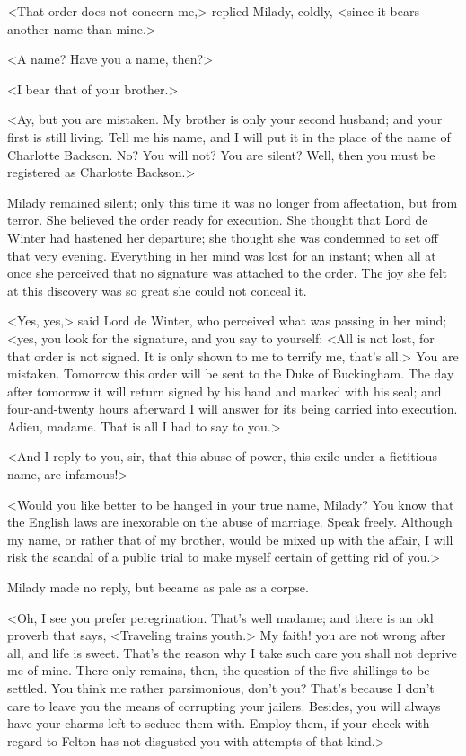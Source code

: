 <That order does not concern me,> replied Milady, coldly, <since it bears another name than mine.> 

<A name? Have you a name, then?> 

<I bear that of your brother.> 

<Ay, but you are mistaken. My brother is only your second husband; and your first is still living. Tell me his name, and I will put it in the place of the name of Charlotte Backson. No? You will not? You are silent? Well, then you must be registered as Charlotte Backson.> 

Milady remained silent; only this time it was no longer from affectation, but from terror. She believed the order ready for execution. She thought that Lord de Winter had hastened her departure; she thought she was condemned to set off that very evening. Everything in her mind was lost for an instant; when all at once she perceived that no signature was attached to the order. The joy she felt at this discovery was so great she could not conceal it. 

<Yes, yes,> said Lord de Winter, who perceived what was passing in her mind; <yes, you look for the signature, and you say to yourself: <All is not lost, for that order is not signed. It is only shown to me to terrify me, that's all.> You are mistaken. Tomorrow this order will be sent to the Duke of Buckingham. The day after tomorrow it will return signed by his hand and marked with his seal; and four-and-twenty hours afterward I will answer for its being carried into execution. Adieu, madame. That is all I had to say to you.> 

<And I reply to you, sir, that this abuse of power, this exile under a fictitious name, are infamous!> 

<Would you like better to be hanged in your true name, Milady? You know that the English laws are inexorable on the abuse of marriage. Speak freely. Although my name, or rather that of my brother, would be mixed up with the affair, I will risk the scandal of a public trial to make myself certain of getting rid of you.> 

Milady made no reply, but became as pale as a corpse. 

<Oh, I see you prefer peregrination. That's well madame; and there is an old proverb that says, <Traveling trains youth.> My faith! you are not wrong after all, and life is sweet. That's the reason why I take such care you shall not deprive me of mine. There only remains, then, the question of the five shillings to be settled. You think me rather parsimonious, don't you? That's because I don't care to leave you the means of corrupting your jailers. Besides, you will always have your charms left to seduce them with. Employ them, if your check with regard to Felton has not disgusted you with attempts of that kind.> 

